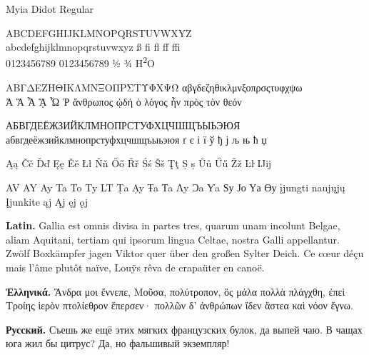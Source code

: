 \documentclass[11pt]{article}
\begin{document}
{\Huge Myia Didot Regular}

{\Large ABCDEFGHIJKLMNOPQRSTUVWXYZ\\
abcdefghijklmnopqrstuvwxyz ß ﬁ ﬂ ff ffi\\
0123456789 {0123456789} ½ ¾ H\textsuperscript{2}O}

{\Large ΑΒΓΔΕΖΗΘΙΚΛΜΝΞΟΠΡΣΤΥΦΧΨΩ αβγδεζηθικλμνξοπρσςτυφχψω\\
Ἀ Ἄ Ἆ ᾌ Ὦ Ῥ ἄνθρωπος ᾠδή ὁ λόγος ἦν πρὸς τὸν θεόν}

{\Large АБВГДЕЁЖЗИЙКЛМНОПРСТУФХЦЧШЩЪЫЬЭЮЯ\\
абвгдеёжзийклмнопрстуфхцчшщъыьэюя ґ є і ї ў ђ ј љ њ ћ џ}

{\Large Ąą Čč Ďď Ęę Ěě Łł Ňň Őő Řř Śś Šš Ţţ Ș ș Ůů Űű Žž Ŀŀ Ĳĳ}

{\Large AV AY Ay Ta To Ty LT Ṭa Ạy Ŧa Ƭa Ʌy Ɔa Ƴa Ѕу Јо Үа Өу
įjungti naujųjų Įjunkite ąj Ąj ęj ǫj}

\textbf{Latin.} Gallia est omnis divisa in partes tres, quarum unam incolunt
Belgae, aliam Aquitani, tertiam qui ipsorum lingua Celtae, nostra Galli
appellantur. Zwölf Boxkämpfer jagen Viktor quer über den großen Sylter Deich.
Ce cœur déçu mais l’âme plutôt naïve, Louÿs rêva de crapaüter en canoë.

\textbf{Ἑλληνικά.} Ἄνδρα μοι ἔννεπε, Μοῦσα, πολύτροπον, ὃς μάλα πολλὰ
πλάγχθη, ἐπεὶ Τροίης ἱερὸν πτολίεθρον ἔπερσεν· πολλῶν δ’ ἀνθρώπων ἴδεν
ἄστεα καὶ νόον ἔγνω.

\textbf{Русский.} Съешь же ещё этих мягких французских булок, да выпей чаю.
В чащах юга жил бы цитрус? Да, но фальшивый экземпляр!
\end{document}
